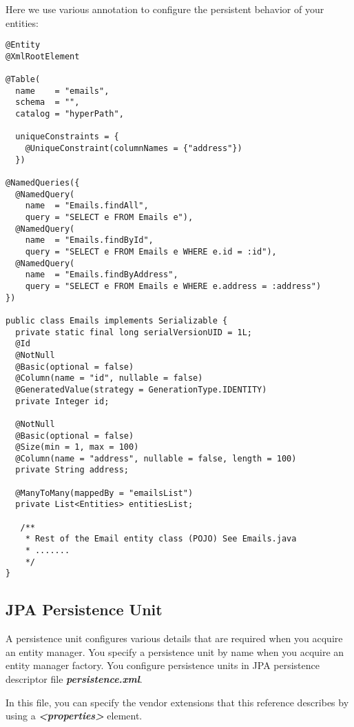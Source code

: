 Here we use various annotation to configure the persistent behavior of your entities:
\begin{lstlisting}[label=Emails JPA entity,caption=Emails JPA entity]
@Entity
@XmlRootElement

@Table(
  name    = "emails",
  schema  = "",
  catalog = "hyperPath",

  uniqueConstraints = {
    @UniqueConstraint(columnNames = {"address"})
  })

@NamedQueries({
  @NamedQuery(
    name  = "Emails.findAll",
    query = "SELECT e FROM Emails e"),
  @NamedQuery(
    name  = "Emails.findById",
    query = "SELECT e FROM Emails e WHERE e.id = :id"),
  @NamedQuery(
    name  = "Emails.findByAddress",
    query = "SELECT e FROM Emails e WHERE e.address = :address")
})

public class Emails implements Serializable {
  private static final long serialVersionUID = 1L;
  @Id
  @NotNull
  @Basic(optional = false)
  @Column(name = "id", nullable = false)
  @GeneratedValue(strategy = GenerationType.IDENTITY)
  private Integer id;

  @NotNull
  @Basic(optional = false)
  @Size(min = 1, max = 100)
  @Column(name = "address", nullable = false, length = 100)
  private String address;

  @ManyToMany(mappedBy = "emailsList")
  private List<Entities> entitiesList;

   /**
    * Rest of the Email entity class (POJO) See Emails.java
  	* .......
  	*/
}
\end{lstlisting}

\subsection{JPA Persistence Unit}
A persistence unit configures various details that are required when you acquire an entity manager. You specify a persistence unit by name when you acquire an entity manager factory. You configure persistence units in JPA persistence descriptor file \textbf{\textit{\textsf{persistence.xml}}}.

In this file, you can specify the vendor extensions that this reference describes by using a \textit{\textbf{\textsf{<properties>}}} element.

